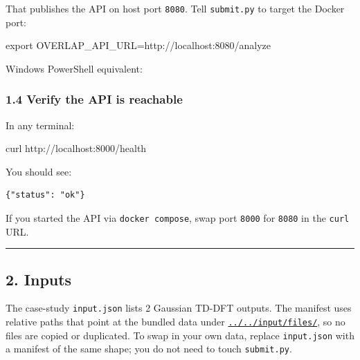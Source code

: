\documentclass[
  11pt,
]{article}
\newenvironment{Shaded}{}{}
\newcommand{\BuiltInTok}[1]{#1}
\newcommand{\ExtensionTok}[1]{#1}
\newcommand{\NormalTok}[1]{#1}
\newcommand{\OperatorTok}[1]{\textcolor[rgb]{0.40,0.40,0.40}{#1}}
\newcommand{\StringTok}[1]{\textcolor[rgb]{0.25,0.44,0.63}{#1}}
\newcommand{\VariableTok}[1]{\textcolor[rgb]{0.10,0.09,0.49}{#1}}
\begin{document}
That publishes the API on host port \texttt{8080}. Tell
\texttt{submit.py} to target the Docker port:

\begin{Shaded}
\begin{Highlighting}[]
\BuiltInTok{export} \VariableTok{OVERLAP\_API\_URL=}\NormalTok{http://localhost:8080/analyze}
\end{Highlighting}
\end{Shaded}

Windows PowerShell equivalent:

\begin{Shaded}
\end{Shaded}

\hypertarget{14-verify-the-api-is-reachable}{
\subsubsection{1.4 Verify the API is
reachable}\label{14-verify-the-api-is-reachable}}

In any terminal:

\begin{Shaded}
\begin{Highlighting}[]
\ExtensionTok{curl}\NormalTok{ http://localhost:8000/health}
\end{Highlighting}
\end{Shaded}

You should see:

\begin{verbatim}
{"status": "ok"}
\end{verbatim}

If you started the API via \texttt{docker\ compose}, swap port
\texttt{8000} for \texttt{8080} in the \texttt{curl} URL.

\begin{center}\rule{0.5\linewidth}{0.5pt}\end{center}

\hypertarget{2-inputs}{
\subsection{2. Inputs}\label{2-inputs}}

The case-study \texttt{input.json} lists 2 Gaussian TD-DFT outputs. The
manifest uses relative paths that point at the bundled data under
\href{https://github.com/pinarsyt/overlap-calculator/blob/main/input/files}{\texttt{../../input/files/}},
so no files are copied or duplicated. To swap in your own data, replace
\texttt{input.json} with a manifest of the same shape; you do not need
to touch \texttt{submit.py}.
\end{document}
